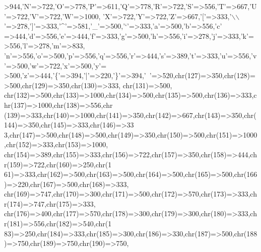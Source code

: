 \begin{DoxyCode}
{      >944,\textcolor{charliteral}{'N'}=>722,\textcolor{charliteral}{'O'}=>778,\textcolor{charliteral}{'P'}=>611,\textcolor{charliteral}{'Q'}=>778,\textcolor{charliteral}{'R'}=>722,\textcolor{charliteral}{'S'}=>556,\textcolor{charliteral}{'T'}=>667,\textcolor{charliteral}{'U'}=>722,\textcolor{charliteral}{'V'}=>722,\textcolor{charliteral}{'W'}=>1000,
    \textcolor{charliteral}{'X'}=>722,\textcolor{charliteral}{'Y'}=>722,\textcolor{charliteral}{'Z'}=>667,\textcolor{charliteral}{'['}=>333,\textcolor{charliteral}{'\(\backslash\)\(\backslash\)'}=>278,\textcolor{charliteral}{']'}=>333,\textcolor{charliteral}{'^'}=>581,\textcolor{charliteral}{'\_'}=>500,\textcolor{charliteral}{'`'}=>333,\textcolor{charliteral}{'a'}=>500,\textcolor{charliteral}{'b'}=>556,\textcolor{charliteral}{'c'}
      =>444,\textcolor{charliteral}{'d'}=>556,\textcolor{charliteral}{'e'}=>444,\textcolor{charliteral}{'f'}=>333,\textcolor{charliteral}{'g'}=>500,\textcolor{charliteral}{'h'}=>556,\textcolor{charliteral}{'i'}=>278,\textcolor{charliteral}{'j'}=>333,\textcolor{charliteral}{'k'}=>556,\textcolor{charliteral}{'l'}=>278,\textcolor{charliteral}{'m'}=>833,
    \textcolor{charliteral}{'n'}=>556,\textcolor{charliteral}{'o'}=>500,\textcolor{charliteral}{'p'}=>556,\textcolor{charliteral}{'q'}=>556,\textcolor{charliteral}{'r'}=>444,\textcolor{charliteral}{'s'}=>389,\textcolor{charliteral}{'t'}=>333,\textcolor{charliteral}{'u'}=>556,\textcolor{charliteral}{'v'}=>500,\textcolor{charliteral}{'w'}=>722,\textcolor{charliteral}{'x'}=>500,\textcolor{charliteral}{'y'}=
      >500,\textcolor{charliteral}{'z'}=>444,\textcolor{charliteral}{'\{'}=>394,\textcolor{charliteral}{'|'}=>220,\textcolor{charliteral}{'\}'}=>394,\textcolor{charliteral}{'~'}=>520,chr(127)=>350,chr(128)=>500,chr(129)=>350,chr(130)=>333,
      chr(131)=>500,
    chr(132)=>500,chr(133)=>1000,chr(134)=>500,chr(135)=>500,chr(136)=>333,chr(137)=>1000,chr(138)=>556,chr
      (139)=>333,chr(140)=>1000,chr(141)=>350,chr(142)=>667,chr(143)=>350,chr(144)=>350,chr(145)=>333,chr(146)=>33
      3,chr(147)=>500,chr(148)=>500,chr(149)=>350,chr(150)=>500,chr(151)=>1000,chr(152)=>333,chr(153)=>1000,
    chr(154)=>389,chr(155)=>333,chr(156)=>722,chr(157)=>350,chr(158)=>444,chr(159)=>722,chr(160)=>250,chr(1
      61)=>333,chr(162)=>500,chr(163)=>500,chr(164)=>500,chr(165)=>500,chr(166)=>220,chr(167)=>500,chr(168)=>333,
      chr(169)=>747,chr(170)=>300,chr(171)=>500,chr(172)=>570,chr(173)=>333,chr(174)=>747,chr(175)=>333,
    chr(176)=>400,chr(177)=>570,chr(178)=>300,chr(179)=>300,chr(180)=>333,chr(181)=>556,chr(182)=>540,chr(1
      83)=>250,chr(184)=>333,chr(185)=>300,chr(186)=>330,chr(187)=>500,chr(188)=>750,chr(189)=>750,chr(190)=>750,
}
\end{DoxyCode}
